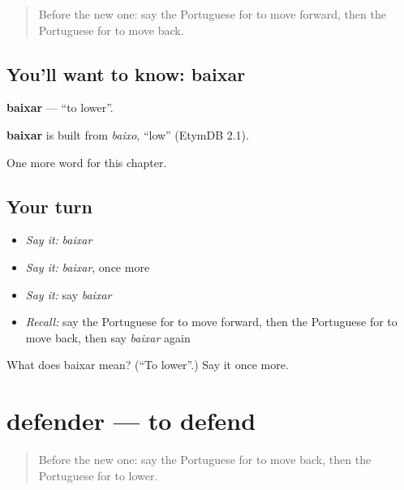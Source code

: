 \label{lesson:PT-C179-baixar}



\begin{quote}
Before the new one: say the Portuguese for to move forward, then the Portuguese for to move back.
\end{quote}

\subsection*{You'll want to know: baixar}
\textbf{baixar} — \textquotedblleft{}to lower\textquotedblright{}.

\begin{cousinweb}
\textbf{baixar} is built from \emph{baixo}, \textquotedblleft{}low\textquotedblright{} (EtymDB 2.1).
\end{cousinweb}

\begin{grammarlens}[title={What you've built}]
One more word for this chapter.
\end{grammarlens}

\subsection*{Your turn}
\begin{itemize}
\raggedright
  \item \emph{Say it:} \emph{baixar}
  \item \emph{Say it:} \emph{baixar}, once more
  \item \emph{Say it:} say \emph{baixar}
  \item \emph{Recall:} say the Portuguese for to move forward, then the Portuguese for to move back, then say \emph{baixar} again
\end{itemize}

\begin{tcolorbox}[breakable,colback=teal!4,colframe=teal!35!black,title={Before you move on}]
What does baixar mean? (\textquotedblleft{}To lower\textquotedblright{}.) Say it once more.
\end{tcolorbox}
\section[defender]{defender — to defend}

\label{lesson:PT-C179-defender}



\begin{quote}
Before the new one: say the Portuguese for to move back, then the Portuguese for to lower.
\end{quote}

